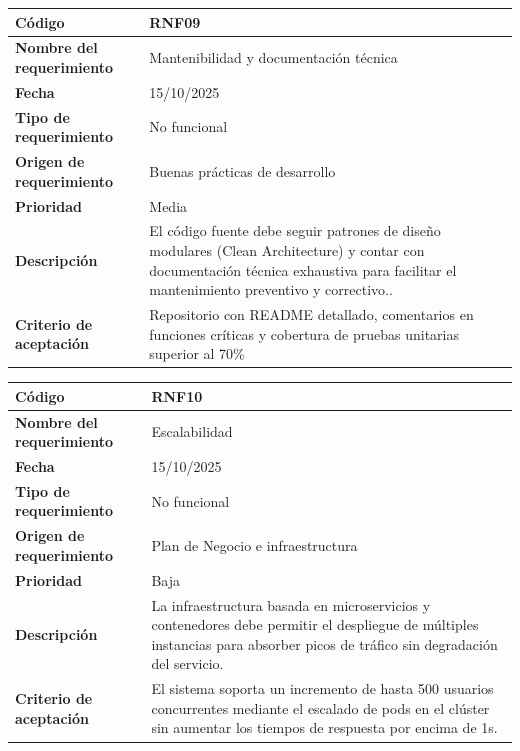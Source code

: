 \begin{table}[H]
	\begin{tabular}{|s{5cm}|m{11cm}|}
		\hline
		\textbf{Código} & RNF09 \\ \hline
		\textbf{Nombre del requerimiento} & Mantenibilidad y documentación técnica\\ \hline
		\textbf{Fecha} & 15/10/2025 \\ \hline
		\textbf{Tipo de requerimiento} & No funcional \\ \hline
		\textbf{Origen de requerimiento} & Buenas prácticas de desarrollo \\ \hline
		\textbf{Prioridad} & Media \\ \hline
		\textbf{Descripción} & El código fuente debe seguir patrones de diseño modulares (Clean Architecture) y contar con documentación técnica exhaustiva para facilitar el mantenimiento preventivo y correctivo.. \\ \hline
		\textbf{Criterio de aceptación} & Repositorio con README detallado, comentarios en funciones críticas y cobertura de pruebas unitarias superior al 70\% \\ \hline
	\end{tabular}
\end{table}

\begin{table}[H]
	\begin{tabular}{|s{5cm}|m{11cm}|}
		\hline
		\textbf{Código} & RNF10 \\ \hline
		\textbf{Nombre del requerimiento} & Escalabilidad \\ \hline
		\textbf{Fecha} & 15/10/2025 \\ \hline
		\textbf{Tipo de requerimiento} & No funcional \\ \hline
		\textbf{Origen de requerimiento} & Plan de Negocio e infraestructura \\ \hline
		\textbf{Prioridad} & Baja \\ \hline
		\textbf{Descripción} & La infraestructura basada en microservicios y contenedores debe permitir el despliegue de múltiples instancias para absorber picos de tráfico sin degradación del servicio. \\ \hline
		\textbf{Criterio de aceptación} & El sistema soporta un incremento de hasta 500 usuarios concurrentes mediante el escalado de pods en el clúster sin aumentar los tiempos de respuesta por encima de 1s. \\ \hline
	\end{tabular}
\end{table}


